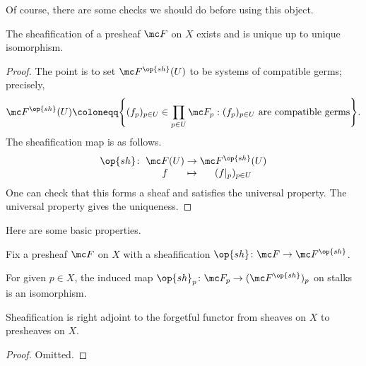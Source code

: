 \documentclass[../notes.tex]{subfiles}
\begin{document}
Of course, there are some checks we should do before using this object.
\begin{lemma}
	The sheafification of a presheaf $\mc F$ on $X$ exists and is unique up to unique isomorphism.
\end{lemma}
\begin{proof}
	The point is to set $\mc F^{\op{sh}}(U)$ to be systems of compatible germs; precisely,
	\[\mc F^{\op{sh}}(U)\coloneqq\Bigg\{(f_p)_{p\in U}\in\prod_{p\in U}\mc F_p:(f_p)_{p\in U}\text{ are compatible germs}\Bigg\}.\]
	The sheafification map is as follows.
	\[\arraycolsep=1.4pt\begin{array}{ccccccccc}
		{\op{sh}}\colon & \mc F(U) &\to& \mc F^{\op{sh}}(U) \\
		& f &\mapsto& (f|_p)_{p\in U}
	\end{array}\]
	One can check that this forms a sheaf and satisfies the universal property. The universal property gives the uniqueness.
\end{proof}
Here are some basic properties.
\begin{proposition}
	Fix a presheaf $\mc F$ on $X$ with a sheafification ${\op{sh}}\colon\mc F\to\mc F^{\op{sh}}$.
	\begin{listalph}
		\item For given $p\in X$, the induced map ${\op{sh}_p}\colon\mc F_p\to(\mc F^{\op{sh}})_p$ on stalks is an isomorphism.
		\item Sheafification is right adjoint to the forgetful functor from sheaves on $X$ to presheaves on $X$.
	\end{listalph}
\end{proposition}
\begin{proof}
	Omitted.
\end{proof}
\end{document}
